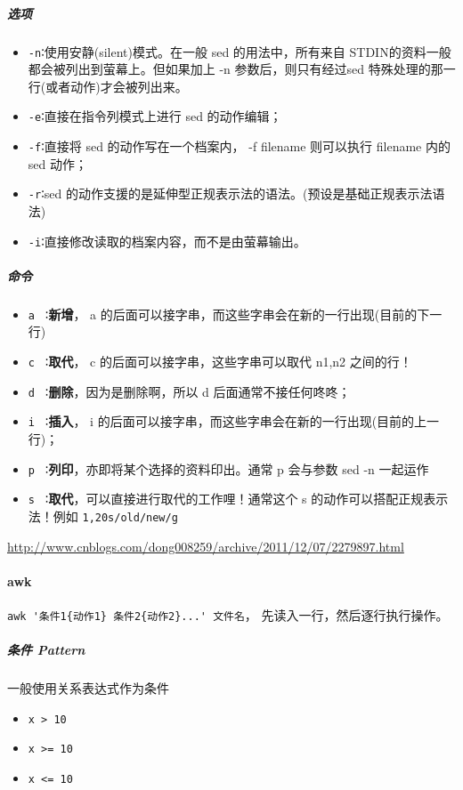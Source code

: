 \documentclass[UTF8,a4paper,12pt]{ctexbook}
\begin{document}
			\subparagraph{选项}
				\begin{itemize}[itemindent = 1em]
					\item \verb|-n|∶使用安静(silent)模式。在一般 sed 的用法中，所有来自 STDIN的资料一般都会被列出到萤幕上。但如果加上 -n 参数后，则只有经过sed 特殊处理的那一行(或者动作)才会被列出来。
					
					\item \verb|-e|∶直接在指令列模式上进行 sed 的动作编辑；
					    
					\item \verb|-f|∶直接将 sed 的动作写在一个档案内， -f filename 则可以执行 filename 内的sed 动作；
					
					\item \verb|-r|∶sed 的动作支援的是延伸型正规表示法的语法。(预设是基础正规表示法语法)
					   
					\item \verb|-i|∶直接修改读取的档案内容，而不是由萤幕输出。
				\end{itemize}
			\subparagraph{命令}
				\begin{itemize}[itemindent = 1em]
					 \item \verb|a |  ∶\textbf{新增}， a 的后面可以接字串，而这些字串会在新的一行出现(目前的下一行)
					 \item \verb|c |  ∶\textbf{取代}， c 的后面可以接字串，这些字串可以取代 n1,n2 之间的行！
					 \item \verb|d |  ∶\textbf{删除}，因为是删除啊，所以 d 后面通常不接任何咚咚；
					 \item \verb|i |  ∶\textbf{插入}， i 的后面可以接字串，而这些字串会在新的一行出现(目前的上一行)；
					 \item \verb|p |  ∶\textbf{列印}，亦即将某个选择的资料印出。通常 p 会与参数 sed -n 一起运作
					 \item \verb|s |  ∶\textbf{取代}，可以直接进行取代的工作哩！通常这个 s 的动作可以搭配正规表示法！例如 \verb|1,20s/old/new/g|
				\end{itemize}
		
		\url{http://www.cnblogs.com/dong008259/archive/2011/12/07/2279897.html}
		
		\paragraph{awk}	
			\verb|awk '条件1{动作1} 条件2{动作2}...' 文件名|， 先读入一行，然后逐行执行操作。
			
			\subparagraph{条件 Pattern}一般使用关系表达式作为条件
				\begin{itemize}[itemindent = 1em]
					\item \verb|x > 10|
					\item \verb|x >= 10|
					\item \verb|x <= 10|
				\end{itemize}
		
\end{document}
